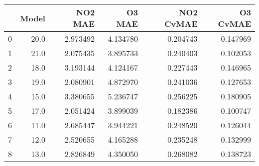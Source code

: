 \begin{tabular}{lrrrrr}
\toprule
{} &  Model &   NO2 MAE &    O3 MAE &  NO2 CvMAE &  O3 CvMAE \\
\midrule
0 &   20.0 &  2.973492 &  4.134780 &   0.204743 &  0.147969 \\
1 &   21.0 &  2.075435 &  3.895733 &   0.240403 &  0.102053 \\
2 &   18.0 &  3.193144 &  4.124167 &   0.227443 &  0.146965 \\
3 &   19.0 &  2.080901 &  4.872970 &   0.241036 &  0.127653 \\
4 &   15.0 &  3.380655 &  5.236747 &   0.256225 &  0.180905 \\
5 &   17.0 &  2.051424 &  3.899039 &   0.182386 &  0.100747 \\
6 &   11.0 &  2.685447 &  3.944221 &   0.248520 &  0.126044 \\
7 &   12.0 &  2.520655 &  4.165288 &   0.235248 &  0.132999 \\
8 &   13.0 &  2.826849 &  4.350050 &   0.268082 &  0.138723 \\
\bottomrule
\end{tabular}
